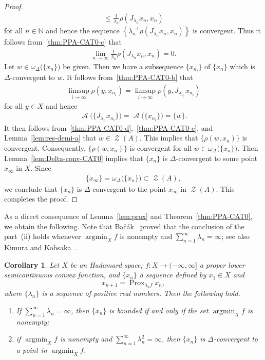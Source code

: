 \documentclass[draft]{amsart}
\numberwithin{equation}{section}
\def\N{\mathbb N}
\DeclareMathOperator*{\Argmin}{argmin}
\DeclareMathOperator{\AC}{\mathcal{A}}
\DeclareMathOperator{\Prox}{Prox}
\DeclareMathOperator{\Zer}{\mathcal{Z}}
\theoremstyle{plain}
\newtheorem{corollary}[theorem]{Corollary}
\theoremstyle{definition}
\theoremstyle{remark}
\begin{document}
\begin{proof}
\begin{align*}
  \leq \frac{1}{\lambda_{n}} \rho(J_{\lambda_{n}}x_{n}, x_{n}) 
 \end{align*}
 for all $n\in \N$ and hence the sequence 
 $\left\{\lambda_n^{-1}\rho(J_{\lambda_{n}}x_{n}, x_{n})\right\}$
 is convergent. Thus it follows from~\eqref{thm:PPA-CAT0-c} that 
 \begin{align}\label{thm:PPA-CAT0-d}
  \lim_{n\to \infty}\frac{1}{\lambda_n}\rho(J_{\lambda_{n}}x_{n}, x_n) = 0. 
 \end{align}
 Let $w\in \omega_{\Delta}\bigl(\{x_n\}\bigr)$ be given. 
 Then we have a subsequence $\{x_{n_i}\}$ of $\{x_n\}$ which is 
 $\Delta$-convergent to $w$. 
 It follows from~\eqref{thm:PPA-CAT0-b} that 
 \begin{align*}
  \limsup_{i\to \infty}\rho(y, x_{n_i}) 
  = \limsup_{i\to \infty}\rho(y, J_{\lambda_{n_i}}x_{n_i})
 \end{align*}
 for all $y\in X$ and hence 
 \begin{align}\label{thm:PPA-CAT0-e}
  \AC\bigl(\{J_{\lambda_n}x_{n_i}\}\bigr) 
  = \AC\bigl(\{x_{n_i}\}\bigr) 
  = \{w\}. 
 \end{align}
 It then follows from~\eqref{thm:PPA-CAT0-d},~\eqref{thm:PPA-CAT0-e}, 
 and Lemma~\ref{lem:res-demi-a} that $w\in \Zer (A)$. 
 This implies that $\{\rho(w, x_{n})\}$ is convergent. 
 Consequently, $\{\rho(w, x_{n})\}$ is convergent 
 for all $w\in \omega_{\Delta}\bigl(\{x_n\}\bigr)$. 
 Then Lemma~\ref{lem:Delta-conv-CAT0} implies that 
 $\{x_{n}\}$ is $\Delta$-convergent to some point $x_{\infty}$ 
 in $X$. Since 
 \begin{align*}
  \{x_{\infty}\} = \omega_{\Delta}\bigl(\{x_n\}\bigr) \subset \Zer (A), 
 \end{align*}
 we conclude that $\{x_n\}$ is $\Delta$-convergent to 
 the point $x_{\infty}$ in $\Zer(A)$. 
 This completes the proof. 
\end{proof}

As a direct consequence of Lemma~\ref{lem:prox} 
and Theorem~\ref{thm:PPA-CAT0}, we obtain the following. 
Note that Ba{\v{c}}{\'a}k~\cite{MR3047087} proved that 
the conclusion of the part~(ii) holds whenever 
$\Argmin_X f$ is nonempty and $\sum_{n=1}^{\infty}\lambda_n =\infty$; 
see also Kimura and Kohsaka~\cite{MR3574140}. 

\begin{corollary}
 Let $X$ be an Hadamard space, 
 $f\colon X\to (-\infty, \infty]$ a proper lower semicontinuous convex function, 
 and $\{x_n\}$ a sequence defined by $x_1\in X$ and 
 \[
  x_{n+1} = \Prox_{\lambda_n f} x_n, 
 \]
 where $\{\lambda_n\}$ is a sequence of positive real numbers. 
 Then the following hold. 
 \begin{enumerate}
  \item[(i)] If $\sum_{n=1}^{\infty}\lambda_n = \infty$, 
 then $\{x_n\}$ is bounded if and only if the set $\Argmin_X f$ is nonempty; 
  \item[(ii)] if $\Argmin_X f$ is nonempty and 
 $\sum_{n=1}^{\infty}\lambda_n^2 =\infty$, 
 then $\{x_n\}$ is $\Delta$-convergent to 
 a point in $\Argmin_X f$. 
 \end{enumerate} 
\end{corollary}
\end{document}
